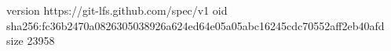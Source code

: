 version https://git-lfs.github.com/spec/v1
oid sha256:fc36b2470a0826305038926a624ed64e05a05abc16245cdc70552aff2eb40afd
size 23958
